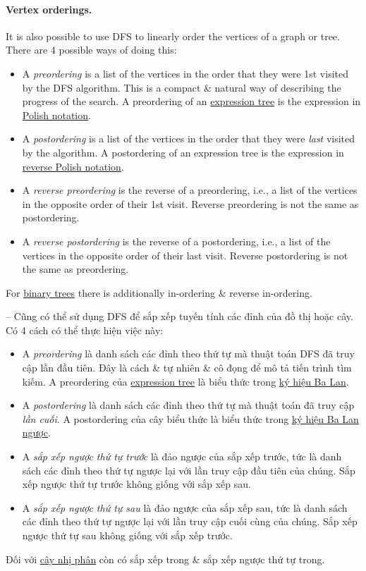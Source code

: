\documentclass[oneside]{book}
\begin{document}
\paragraph{Vertex orderings.} It is also possible to use DFS to linearly order the vertices of a graph or tree. There are 4 possible ways of doing this:
\begin{itemize}
	\item A {\it preordering} is a list of the vertices in the order that they were 1st visited by the DFS algorithm. This is a compact \& natural way of describing the progress of the search. A preordering of an \href{https://en.wikipedia.org/wiki/Parse_tree}{expression tree} is the expression in \href{https://en.wikipedia.org/wiki/Polish_notation}{Polish notation}.
	\item A {\it postordering} is a list of the vertices in the order that they were {\it last} visited by the algorithm. A postordering of an expression tree is the expression in \href{https://en.wikipedia.org/wiki/Reverse_Polish_notation}{reverse Polish notation}.
	\item A {\it reverse preordering} is the reverse of a preordering, i.e., a list of the vertices in the opposite order of their 1st visit. Reverse preordering is not the same as postordering.
	\item A {\it reverse postordering} is the reverse of a postordering, i.e., a list of the vertices in the opposite order of their last visit. Reverse postordering is not the same as preordering.
\end{itemize}
For \href{https://en.wikipedia.org/wiki/Binary_trees}{binary trees} there is additionally in-ordering \& reverse in-ordering.

-- Cũng có thể sử dụng DFS để sắp xếp tuyến tính các đỉnh của đồ thị hoặc cây. Có 4 cách có thể thực hiện việc này:
\begin{itemize}
	\item A {\it preordering} là danh sách các đỉnh theo thứ tự mà thuật toán DFS đã truy cập lần đầu tiên. Đây là cách \& tự nhiên \& cô đọng để mô tả tiến trình tìm kiếm. A preordering của \href{https://en.wikipedia.org/wiki/Parse_tree}{expression tree} là biểu thức trong \href{https://en.wikipedia.org/wiki/Polish_notation}{ký hiệu Ba Lan}.
	\item A {\it postordering} là danh sách các đỉnh theo thứ tự mà thuật toán đã truy cập {\it lần cuối}. A postordering của cây biểu thức là biểu thức trong \href{https://en.wikipedia.org/wiki/Reverse_Polish_notation}{ký hiệu Ba Lan ngược}.
	
	\item A {\it sắp xếp ngược thứ tự trước} là đảo ngược của sắp xếp trước, tức là danh sách các đỉnh theo thứ tự ngược lại với lần truy cập đầu tiên của chúng. Sắp xếp ngược thứ tự trước không giống với sắp xếp sau.
	\item A {\it sắp xếp ngược thứ tự sau} là đảo ngược của sắp xếp sau, tức là danh sách các đỉnh theo thứ tự ngược lại với lần truy cập cuối cùng của chúng. Sắp xếp ngược thứ tự sau không giống với sắp xếp trước.
\end{itemize}
Đối với \href{https://en.wikipedia.org/wiki/Binary_trees}{cây nhị phân} còn có sắp xếp trong \& sắp xếp ngược thứ tự trong.
\end{document}
